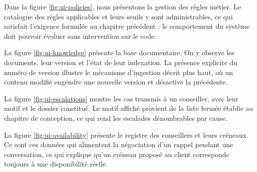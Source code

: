 
Dans la figure \ref{fig:ui-policies}, nous présentons la gestion des règles métier. Le catalogue des règles applicables et leurs seuils y sont administrables, ce qui satisfait l'exigence formulée au chapitre précédent : le comportement du système doit pouvoir évoluer sans intervention sur le code.


La figure \ref{fig:ui-knowledge} présente la base documentaire. On y observe les documents, leur version et l'état de leur indexation. La présence explicite du numéro de version illustre le mécanisme d'ingestion décrit plus haut, où un contenu modifié engendre une nouvelle version et désactive la précédente.


La figure \ref{fig:ui-escalations} montre les cas transmis à un conseiller, avec leur motif et le dossier constitué. Le motif affiché provient de la liste fermée établie au chapitre de conception, ce qui rend les escalades dénombrables par cause.


La figure \ref{fig:ui-availability} présente le registre des conseillers et leurs créneaux. Ce sont ces données qui alimentent la négociation d'un rappel pendant une conversation, ce qui explique qu'un créneau proposé au client corresponde toujours à une disponibilité réelle.


